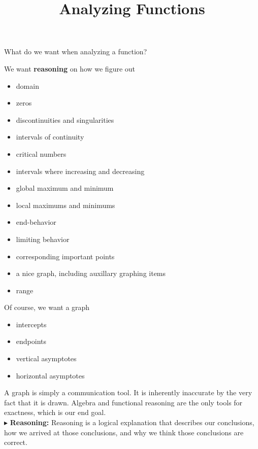 \documentclass{ximera}
\title{Analyzing Functions}
\begin{document}
\begin{abstract}
%
\end{abstract}
\maketitle






What do we want when analyzing a function?


We want \textbf{\textcolor{red!80!black}{reasoning}} on how we figure out

\begin{itemize}
\item domain
\item zeros 
\item discontinuities and singularities
\item intervals of continuity
\item critical numbers
\item intervals where increasing and decreasing
\item global maximum and minimum
\item local maximums and minimums
\item end-behavior
\item limiting behavior
\item corresponding important points
\item a nice graph, including auxillary graphing items
\item range
\end{itemize}



Of course, we want a graph
\begin{itemize}
	\item intercepts
	\item endpoints
	\item vertical asymptotes
	\item horizontal asymptotes
\end{itemize}


A graph is simply a communication tool.  It is inherently inaccurate by the very fact that it is drawn.  Algebra and functional reasoning are the only tools for exactness, which is our end goal. \\



$\blacktriangleright$ \textbf{\textcolor{red!80!black}{Reasoning:}} Reasoning is a logical explanation that describes our conclusions, how we arrived at those conclusions, and why we think those conclusions are correct. \\
\end{document}
